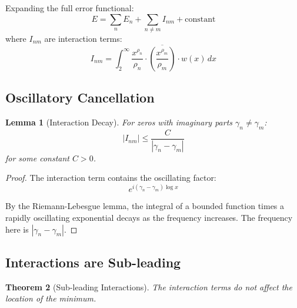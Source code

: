 \documentclass[12pt,a4paper]{article}
\newtheorem{theorem}{Theorem}[section]
\newtheorem{lemma}[theorem]{Lemma}
\theoremstyle{definition}
\theoremstyle{remark}
\begin{document}
Expanding the full error functional:
\begin{equation}
E = \sum_n E_n + \sum_{n \neq m} I_{nm} + \text{constant}
\end{equation}
where $I_{nm}$ are interaction terms:
\begin{equation}
I_{nm} = \int_2^\infty \frac{x^{\rho_n}}{\rho_n} \cdot \overline{\left(\frac{x^{\rho_m}}{\rho_m}\right)} \cdot w(x) \, dx
\end{equation}

\subsection{Oscillatory Cancellation}

\begin{lemma}[Interaction Decay]
\label{lem:interaction}
For zeros with imaginary parts $\gamma_n \neq \gamma_m$:
\begin{equation}
|I_{nm}| \leq \frac{C}{|\gamma_n - \gamma_m|}
\end{equation}
for some constant $C > 0$.
\end{lemma}

\begin{proof}
The interaction term contains the oscillating factor:
\begin{equation}
e^{i(\gamma_n - \gamma_m)\log x}
\end{equation}

By the Riemann-Lebesgue lemma, the integral of a bounded function times a rapidly oscillating exponential decays as the frequency increases. The frequency here is $|\gamma_n - \gamma_m|$.
\end{proof}

\subsection{Interactions are Sub-leading}

\begin{theorem}[Sub-leading Interactions]
\label{thm:subinteraction}
The interaction terms do not affect the location of the minimum.
\end{theorem}
\end{document}
